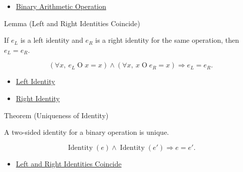\begin{dependencies}
\begin{itemize}
  \item \hyperref[def:binary-arithmetic-operation]{Binary Arithmetic Operation}
\end{itemize}
\end{dependencies}

\begin{lemmabox}{Lemma (Left and Right Identities Coincide)}
\begin{lemma}
\label{lem:left-right-identities-coincide}
If $e_L$ is a left identity and $e_R$ is a right identity for the same
operation, then $e_L=e_R$.
\end{lemma}
\end{lemmabox}

\begin{remark*}
\[
(\forall x,\ e_L\mathbin{O}x=x)\land(\forall x,\ x\mathbin{O}e_R=x)
\Longrightarrow e_L=e_R.
\]
\end{remark*}

\begin{dependencies}
\begin{itemize}
  \item \hyperref[def:left-identity]{Left Identity}
  \item \hyperref[def:right-identity]{Right Identity}
\end{itemize}
\end{dependencies}

\begin{theorembox}{Theorem (Uniqueness of Identity)}
\begin{theorem}
\label{thm:uniqueness-of-identity}
A two-sided identity for a binary operation is unique.
\end{theorem}
\end{theorembox}

\begin{remark*}
\[
\operatorname{Identity}(e)\land\operatorname{Identity}(e') \Longrightarrow e=e'.
\]
\end{remark*}

\begin{dependencies}
\begin{itemize}
  \item \hyperref[lem:left-right-identities-coincide]{Left and Right Identities Coincide}
\end{itemize}
\end{dependencies}
